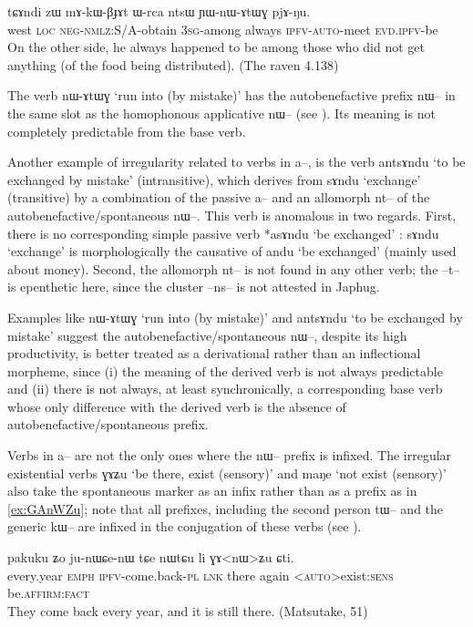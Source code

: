 \documentclass[oldfontcommands,oneside,a4paper,11pt]{article}
\newcommand{\ipa}[1]{{\phon \mbox{#1}}} %
\begin{document}
 \begin{exe}
\ex \label{ex:YWnAtWG}
\gll 
\ipa{tɕɤndi}  	\ipa{zɯ}  	\ipa{mɤ-kɯ-βɟɤt}  	\ipa{ɯ-rca}  	\ipa{ntsɯ}  	\ipa{ɲɯ-nɯ-ɤtɯɣ}  	\ipa{pjɤ-ŋu.}  \\
west \textsc{loc} \textsc{neg-nmlz}:S/A-obtain \textsc{3sg}-among always \textsc{ipfv-auto}-meet \textsc{evd.ipfv}-be \\
\glt On the other side, he   always happened to be among those who did not get anything (of the food being distributed). (The raven 4.138)
\end{exe}

The verb \ipa{nɯ-ɤtɯɣ}  `run into (by mistake)'  has the autobenefactive prefix \ipa{nɯ--} in the same slot as the homophonous applicative \ipa{nɯ--} (see \citealt{jacques13tropative}). Its meaning   is not completely predictable from the base verb.

Another example of irregularity related to verbs in \ipa{a--}, is the verb \ipa{antsɤndu} `to be exchanged by mistake' (intransitive), which derives from   \ipa{sɤndu} `exchange' (transitive) by a combination of the passive \ipa{a--} and an allomorph \ipa{nt--} of the autobenefactive/spontaneous \ipa{nɯ--}. This verb is anomalous in two regards. First, there is no corresponding simple passive verb *\ipa{asɤndu} `be exchanged' : \ipa{sɤndu} `exchange' is morphologically the causative of \ipa{andu} `be exchanged' (mainly used about money). Second, the allomorph \ipa{nt--} is not found in any other verb; the \ipa{--t--} is epenthetic here, since the cluster \ipa{--ns--} is not attested in Japhug.

Examples like \ipa{nɯ-ɤtɯɣ}  `run into (by mistake)' and \ipa{antsɤndu} `to be exchanged by mistake'   suggest the autobenefactive/spontaneous \ipa{nɯ--}, despite its high productivity, is better treated as a derivational rather than an inflectional morpheme, since (i) the meaning of the derived verb is not always predictable and (ii) there is not always, at least synchronically, a corresponding base verb whose only difference with the derived verb is the absence of autobenefactive/spontaneous prefix.
 
Verbs in \ipa{a--} are not the only ones where the \ipa{nɯ--} prefix is infixed. The irregular existential verbs \ipa{ɣɤʑu} `be there, exist (sensory)'  and \ipa{maŋe} `not exist (sensory)' also take  the spontaneous marker as an infix rather than as a prefix as in \ref{ex:GAnWZu}; note that all prefixes, including the second person \ipa{tɯ--} and the generic \ipa{kɯ--} are infixed in the conjugation of these verbs (see \citealt{jacques12agreement, jacques15generic}).
\begin{exe}
\ex \label{ex:GAnWZu}
\gll 
 \ipa{pakuku}  	\ipa{ʑo}  	\ipa{ju-nɯɕe-nɯ}  	\ipa{tɕe}  	\ipa{nɯtɕu}  	\ipa{li}  	\ipa{ɣɤ<nɯ>ʑu}  	\ipa{ɕti.}  	\\
 every.year \textsc{emph} \textsc{ipfv}-come.back-\textsc{pl} \textsc{lnk} there again <\textsc{auto}>exist:\textsc{sens} be.\textsc{affirm:fact} \\
 \glt They come back every year, and it is still there. (Matsutake, 51)
\end{exe}
\end{document}
